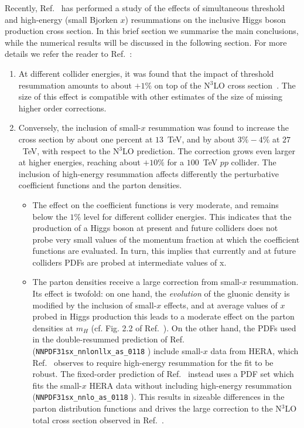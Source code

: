 Recently, Ref.~\cite{Bonvini:2018ixe} has performed a study of the
effects of simultaneous threshold and high-energy (small Bjorken $x$)
resummations on the inclusive Higgs boson production cross section. In this brief
section we summarise the main conclusions, while the numerical results
will be discussed in the following section. For more details we refer
the reader to Ref.~\cite{Bonvini:2018ixe}:
\begin{enumerate}
\item At different collider energies, it was found that the impact of
  threshold resummation amounts to about $+1\%$ on top of the N$^3$LO
  cross section~\cite{Bonvini:2016frm}. The size of this effect is
  compatible with other estimates of the size of missing higher order
  corrections.
\item Conversely, the inclusion of small-$x$ resummation was found to
  increase the cross section by about one percent at $13$~TeV, and by
  about $3\%-4\%$ at $27$~TeV, with respect to the N$^3$LO
  prediction. The correction grows even larger at higher 
  energies, reaching about $+10\%$ for a $100$~TeV $pp$ collider. The
  inclusion of high-energy resummation affects differently the
  perturbative coefficient functions and the parton densities.
\begin{itemize}
\item The effect on the coefficient functions is very moderate, and
  remains below the $1\%$ level for different collider energies. This
  indicates that the production of a Higgs boson at present and future
  colliders does not probe very small values of the momentum fraction
  at which the coefficient functions are evaluated.
  In turn, this implies that currently and at future colliders PDFs are probed at intermediate values of x.

\item The parton densities receive a large correction from small-$x$
  resummation. Its effect is twofold: on one hand, the {\it evolution}
  of the gluonic density is modified by the inclusion of small-$x$
  effects, and at average values of $x$ probed in Higgs production
  this leads to a moderate effect on the parton densities at $m_H$
  (cf. Fig. 2.2 of Ref.~\cite{Ball:2017otu}). On the other hand, the
  PDFs used in the double-resummed prediction of
  Ref.~\cite{Bonvini:2018ixe} (\verb+NNPDF31sx_nnlonllx_as_0118+
  \cite{Ball:2017otu}) include small-$x$ data from HERA, which
  Ref.~\cite{Ball:2017otu} observes to require high-energy resummation
  for the fit to be robust. The fixed-order prediction of
  Ref.~\cite{Bonvini:2018ixe} instead uses a PDF set which fits the
  small-$x$ HERA data without including high-energy resummation
  (\verb+NNPDF31sx_nnlo_as_0118+ \cite{Ball:2017otu}).  This results
  in sizeable differences in the parton distribution functions and
  drives the large correction to the N$^3$LO total cross section
  observed in Ref.~\cite{Bonvini:2018ixe}.
\end{itemize}
\end{enumerate}
